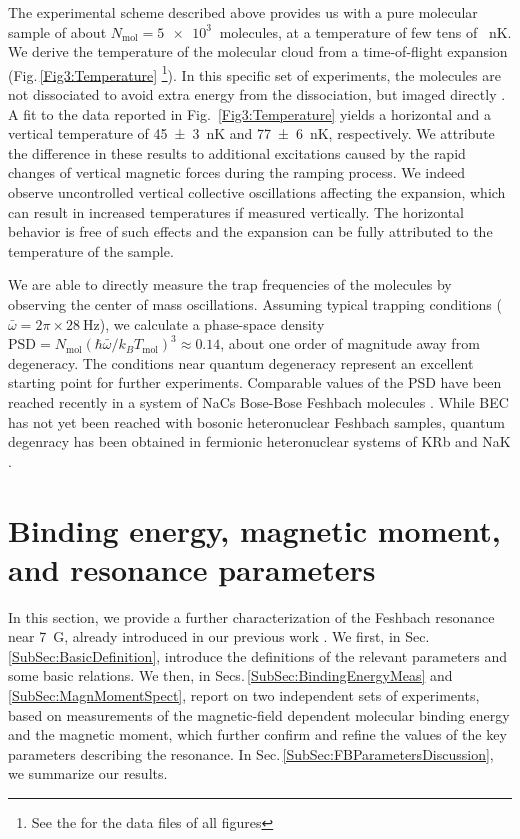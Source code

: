 The experimental scheme described above provides us with a pure molecular sample of about $N_{\textrm{mol}}=\SI{5e3}{}$ molecules, at a temperature of few tens of \SI{}{\nano\kelvin}. We derive the temperature of the molecular cloud from a time-of-flight expansion (Fig.\,\ref{Fig3:Temperature} \footnote{See the  for the data files of all figures}). In this specific set of experiments, the molecules are not dissociated to avoid extra energy from the dissociation, but imaged directly \cite{Duerr2004dou}.  A fit to the data reported in Fig.~\ref{Fig3:Temperature} yields a horizontal and a vertical temperature of \SI{45(3)}{\nano\kelvin} and \SI{77(6)}{\nano\kelvin}, respectively. We attribute the difference in these results to additional excitations caused by the rapid changes of vertical magnetic forces during the ramping process. We indeed observe uncontrolled vertical collective oscillations affecting the expansion, which can result in increased temperatures if measured vertically. The horizontal behavior is free of such effects and the expansion can be fully attributed to the temperature of the sample.

We are able to directly measure the trap frequencies of the molecules by observing the center of mass oscillations. Assuming typical trapping conditions ($\bar{\omega}=2\pi\times\SI{28}{\hertz}$), we calculate a phase-space density $\mathrm{PSD}=N_{\mathrm{mol}}(\hbar\bar{\omega}/k_BT_{\mathrm{mol}})^3\approx0.14$, about one order of magnitude away from degeneracy. The conditions near quantum degeneracy represent an excellent starting point for further experiments. Comparable values of the PSD have been reached recently in a system of NaCs Bose-Bose Feshbach molecules \cite{Lam2022hps}. While BEC has not yet been reached with bosonic heteronuclear Feshbach samples, quantum degenracy has been obtained in fermionic heteronuclear systems of KRb \cite{Demarco2019adf} and NaK \cite{Duda2023tfa}.

\section{Binding energy, magnetic moment, and resonance parameters}
\label{Sec:ResonanceParameter}

In this section, we provide a further characterization of the Feshbach resonance near \SI{7}{ G}, already introduced in our previous work \cite{Ye2022ool}. We first, in Sec.\,\ref{SubSec:BasicDefinition}, introduce the definitions of the relevant parameters and some basic relations. We then, in Secs.\,\ref{SubSec:BindingEnergyMeas} and \ref{SubSec:MagnMomentSpect}, report on two independent sets of experiments, based on measurements of the magnetic-field dependent molecular binding energy and the magnetic moment, which further confirm and refine the values of the key parameters describing the resonance. In Sec.\,\ref{SubSec:FBParametersDiscussion}, we summarize our results. 

